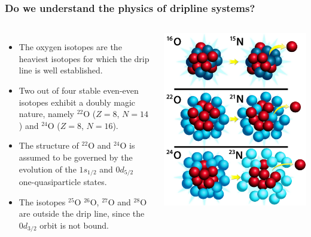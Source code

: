 \documentclass[compress]{beamer}
\begin{document}
\frame
    {
      \frametitle{Do we understand the physics of dripline systems?}
      \begin{footnotesize}
     \begin{columns}
      \column{5.0cm}
\begin{itemize}
\item The oxygen isotopes are the heaviest isotopes for
which the drip line is well established.
\item Two out of four
stable even-even isotopes exhibit a doubly magic nature,
namely $^{22}$O ($Z=8$, $N=14$) and $^{24}$O ($Z=8$, $N=16$).
\item 
The structure of $^{22}$O and $^{24}$O is assumed to be governed
by the evolution of the $1s_{1/2}$ and $0d_{5/2}$  one-quasiparticle states.
\item The isotopes
$^{25}$O
$^{26}$O, $^{27}$O and $^{28}$O are outside the drip line, since the $0d_{3/2}$ orbit is not bound.
\end{itemize}
\column{5cm}
      \begin{center}
	\includegraphics[width=1.2\textwidth]{Figures/oxygens.jpg}
      \end{center}
\end{columns}
      \end{footnotesize}
    }
\end{document}
